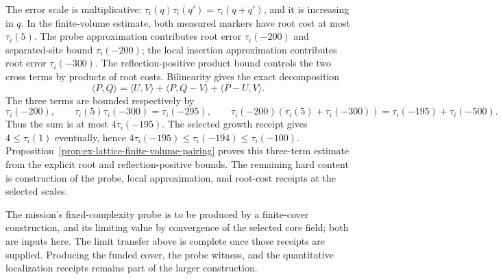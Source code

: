 The error scale is multiplicative:
$\tau_i(q)\tau_i(q')=\tau_i(q+q')$, and it is increasing in $q$. In the
finite-volume estimate, both measured markers have root cost at most
$\tau_i(5)$. The probe approximation contributes root error
$\tau_i(-200)$ and separated-site bound $\tau_i(-200)$; the local
insertion approximation contributes root error $\tau_i(-300)$. The
reflection-positive product bound controls the two cross terms by products
of root costs. Bilinearity gives the exact decomposition
\[
 \langle P,Q\rangle=\langle U,V\rangle
   +\langle P,Q-V\rangle+\langle P-U,V\rangle.
\]
The three terms are bounded respectively by
\[
 \tau_i(-200),\qquad \tau_i(5)\tau_i(-300)=\tau_i(-295),\qquad
 \tau_i(-200)(\tau_i(5)+\tau_i(-300))
      =\tau_i(-195)+\tau_i(-500).
\]
Thus the sum is at most $4\tau_i(-195)$. The selected growth receipt gives
$4\leq\tau_i(1)$ eventually, hence
$4\tau_i(-195)\leq\tau_i(-194)\leq\tau_i(-100)$.
Proposition~\ref{prop:ex-lattice-finite-volume-pairing} proves this
three-term estimate from the explicit root and reflection-positive bounds.
The remaining hard content is construction of the probe, local
approximation, and root-cost receipts at the selected scales.

The mission's fixed-complexity probe is to be produced by a finite-cover
construction, and its limiting value by convergence of the selected core
field; both are inputs here. The limit transfer above is complete once
those receipts are supplied. Producing the funded cover, the probe witness,
and the quantitative localization receipts remains part of the larger
construction.

